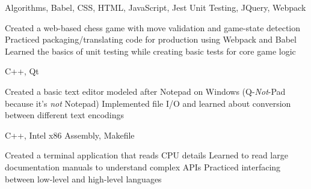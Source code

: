 \documentclass[12pt,letterpaper]{article}
\begin{document}
\begin{pprojectsection}
    {Algorithms, Babel, CSS, HTML, JavaScript, Jest Unit Testing, JQuery, Webpack}{
        \begin{details}
            \detail Created a web-based chess game with move validation and game-state detection
            \detail Practiced packaging/translating code for production using Webpack and Babel
            \detail Learned the basics of unit testing while creating basic tests for core game logic
        \end{details}
    }
    {C++, Qt}{
        \begin{details}
            \detail Created a basic text editor modeled after Notepad on Windows (Q-\emph{Not}-Pad because it's \emph{not} Notepad)
            \detail Implemented file I/O and learned about conversion between different text encodings
        \end{details}
    }
    {C++, Intel x86 Assembly, Makefile}{
        \begin{details}
            \detail Created a terminal application that reads CPU details
            \detail Learned to read large documentation manuals to understand complex APIs
            \detail Practiced interfacing between low-level and high-level languages
        \end{details}
    }
\end{pprojectsection}
\end{document}
